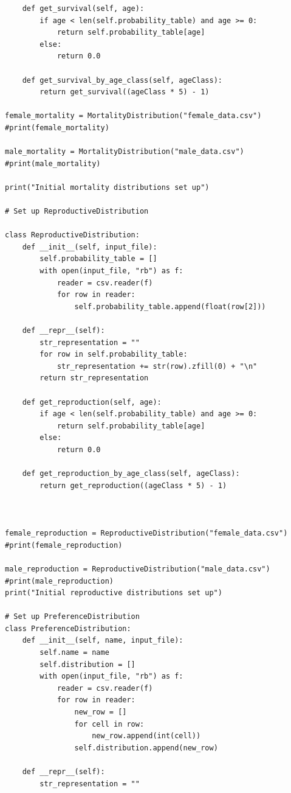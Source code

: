 \documentclass[authoryearcitations]{UoYCSproject}
\begin{document}
\begin{landscape}
\begin{verbatim}
    def get_survival(self, age):
        if age < len(self.probability_table) and age >= 0:
            return self.probability_table[age]
        else:
            return 0.0

    def get_survival_by_age_class(self, ageClass):
        return get_survival((ageClass * 5) - 1)

female_mortality = MortalityDistribution("female_data.csv")
#print(female_mortality)

male_mortality = MortalityDistribution("male_data.csv")
#print(male_mortality)

print("Initial mortality distributions set up")

# Set up ReproductiveDistribution

class ReproductiveDistribution:
    def __init__(self, input_file):
        self.probability_table = []
        with open(input_file, "rb") as f:
            reader = csv.reader(f)
            for row in reader:
                self.probability_table.append(float(row[2]))

    def __repr__(self):
        str_representation = ""
        for row in self.probability_table:
            str_representation += str(row).zfill(0) + "\n"
        return str_representation

    def get_reproduction(self, age):
        if age < len(self.probability_table) and age >= 0:
            return self.probability_table[age]
        else:
            return 0.0

    def get_reproduction_by_age_class(self, ageClass):
        return get_reproduction((ageClass * 5) - 1)



female_reproduction = ReproductiveDistribution("female_data.csv")
#print(female_reproduction)

male_reproduction = ReproductiveDistribution("male_data.csv")
#print(male_reproduction)
print("Initial reproductive distributions set up")

# Set up PreferenceDistribution
class PreferenceDistribution:
    def __init__(self, name, input_file):
        self.name = name
        self.distribution = []
        with open(input_file, "rb") as f:
            reader = csv.reader(f)
            for row in reader:
                new_row = []
                for cell in row:
                    new_row.append(int(cell))
                self.distribution.append(new_row)

    def __repr__(self):
        str_representation = ""


\end{verbatim}
\end{landscape}
\end{document}
